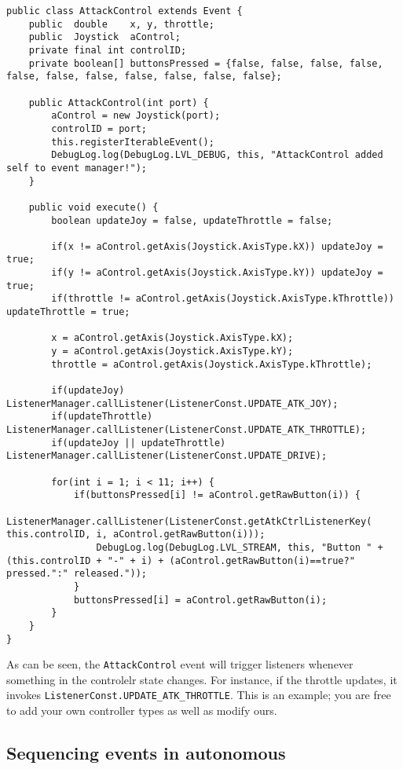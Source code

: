 \documentclass[a4paper]{article}
\begin{document}
\begin{lstlisting}
public class AttackControl extends Event {
    public  double    x, y, throttle;
    public  Joystick  aControl;
    private final int controlID;
    private boolean[] buttonsPressed = {false, false, false, false, false, false, false, false, false, false, false};
    
    public AttackControl(int port) {
        aControl = new Joystick(port);
        controlID = port;
        this.registerIterableEvent();
        DebugLog.log(DebugLog.LVL_DEBUG, this, "AttackControl added self to event manager!");
    }
    
    public void execute() {
        boolean updateJoy = false, updateThrottle = false;
        
        if(x != aControl.getAxis(Joystick.AxisType.kX)) updateJoy = true;
        if(y != aControl.getAxis(Joystick.AxisType.kY)) updateJoy = true;
        if(throttle != aControl.getAxis(Joystick.AxisType.kThrottle)) updateThrottle = true;
        
        x = aControl.getAxis(Joystick.AxisType.kX);
        y = aControl.getAxis(Joystick.AxisType.kY);
        throttle = aControl.getAxis(Joystick.AxisType.kThrottle);
        
        if(updateJoy) ListenerManager.callListener(ListenerConst.UPDATE_ATK_JOY);
        if(updateThrottle) ListenerManager.callListener(ListenerConst.UPDATE_ATK_THROTTLE);
        if(updateJoy || updateThrottle) ListenerManager.callListener(ListenerConst.UPDATE_DRIVE);
        
        for(int i = 1; i < 11; i++) {
            if(buttonsPressed[i] != aControl.getRawButton(i)) {
                ListenerManager.callListener(ListenerConst.getAtkCtrlListenerKey( this.controlID, i, aControl.getRawButton(i)));
                DebugLog.log(DebugLog.LVL_STREAM, this, "Button " + (this.controlID + "-" + i) + (aControl.getRawButton(i)==true?" pressed.":" released."));
            }
            buttonsPressed[i] = aControl.getRawButton(i);
        }
    }
}
\end{lstlisting}

As can be seen, the \lstinline{AttackControl} event will trigger listeners whenever something in the controlelr state changes. For instance, if the throttle updates, it invokes \lstinline{ListenerConst.UPDATE_ATK_THROTTLE}. This is an example; you are free to add your own controller types as well as modify ours.

\subsection{Sequencing events in autonomous}
\end{document}
